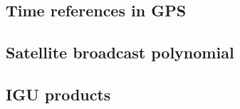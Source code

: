 \subsection{Time references in GPS}

\subsection{Satellite broadcast polynomial}

\subsection{IGU products}
